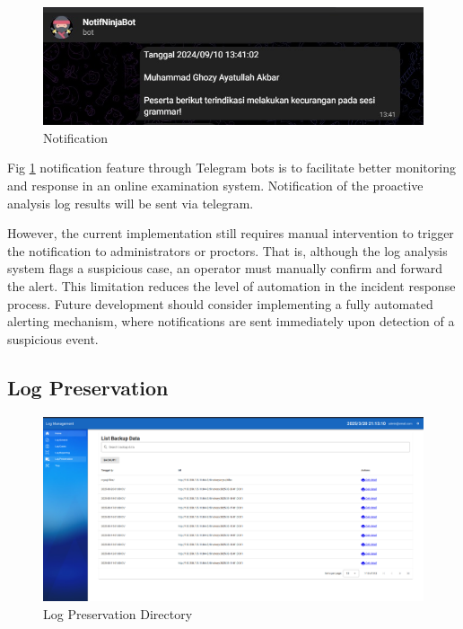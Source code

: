 \begin{figure}[H] 
	\centering
	\includegraphics[width=14cm]{figure/log-notification.jpeg}
	\caption{Notification}
	\label{fig:telegram-notification}
\end{figure}

Fig \ref{fig:telegram-notification} notification feature through Telegram bots is to facilitate better monitoring and response in an online examination system. Notification of the proactive analysis log results will be sent via telegram. 

However, the current implementation still requires manual intervention to trigger the notification to administrators or proctors. That is, although the log analysis system flags a suspicious case, an operator must manually confirm and forward the alert. This limitation reduces the level of automation in the incident response process. Future development should consider implementing a fully automated alerting mechanism, where notifications are sent immediately upon detection of a suspicious event.
\subsection{Log Preservation}
\begin{figure}[H] 
	\centering
	\includegraphics[width=18cm]{figure/log_preservation.png}
	\caption{Log Preservation Directory}
	\label{fig:log-preservation-1}
\end{figure}

